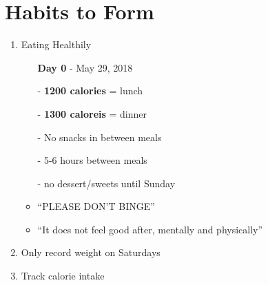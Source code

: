 \documentclass[10pt]{article}
\begin{document}
\newpage
\section*{Habits to Form}
\begin{enumerate}
    \item Eating Healthily
    \begin{itemize}
        \item[] \textbf{Day 0} - May 29, 2018
        \item[-] \textbf{1200 calories} = lunch
        \item[-] \textbf{1300 caloreis} = dinner
        \item[-] No snacks in between meals
        \item[-] 5-6 hours between meals
        \item[-] no dessert/sweets until Sunday
        \item ``PLEASE DON'T BINGE''
        \item ``It does not feel good after, mentally and physically''
    \end{itemize}
    \item Only record weight on Saturdays
    \item Track calorie intake
\end{enumerate}
\end{document}
